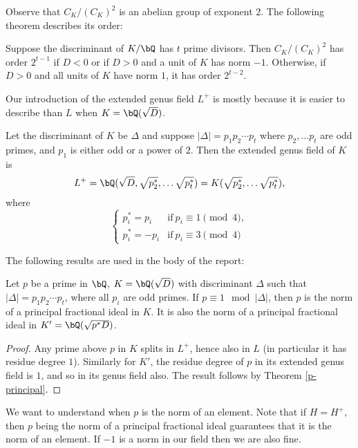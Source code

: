Observe that $C_K / (C_K)^2$ is an abelian group of exponent $2$. The following theorem describes its order:

\begin{thm} 
Suppose the discriminant of $K / \bQ$ has $t$ prime divisors. Then $C_K / (C_K)^2$ has order $2^{t-1}$ if $D < 0$ or if $D > 0$ and a unit of $K$ has norm $-1$. Otherwise, if $D > 0$ and all units of $K$ have norm $1$, it has order $2^{t - 2}$.
\end{thm} 

Our introduction of the extended genus field $L^{+}$ is mostly because it is easier to describe than $L$ when $K = \bQ(\sqrt{D})$.

\begin{thm} 
Let the discriminant of $K$ be $\Delta$ and suppose $|\Delta| = p_1 p_2 \cdots p_t$ where $p_2, \ldots p_t$ are odd primes, and $p_1$ is either odd or a power of $2$. Then the extended genus field of $K$ is 
    \[ L^{+} = \bQ(\sqrt{D}, \sqrt{p_2^*}, \ldots \sqrt{p_t^*}) = K(\sqrt{p_2^*}, \ldots \sqrt{p_t^*}), \] 
where 
\[ \begin{cases}
    p_i^* = p_i & \mathrm{if }\ p_i \equiv 1 \pmod 4, \\
    p_i^* = -p_i & \mathrm{if }\ p_i \equiv 3 \pmod 4
\end{cases}\]
\end{thm} 

\vspace{2em}

The following results are used in the body of the report:

\begin{cor}\label{p-one-mod-disc}
    Let $p$ be a prime in $\bQ$, $K = \bQ(\sqrt{D})$ with discriminant $\Delta$ such that $|\Delta| = p_1 p_2 \cdots p_t$, where all $p_i$ are odd primes. If $p \equiv 1 \mod {|\Delta|}$, then $p$ is the norm of a principal fractional ideal in $K$. It is also the norm of a principal fractional ideal in $K' = \bQ({\sqrt{p^*D}})$.
\end{cor}

\begin{proof}
    Any prime above $p$ in $K$ splits in $L^{+}$, hence also in $L$ (in particular it has residue degree $1$). Similarly for $K'$, the residue degree of $p$ in its extended genus field is $1$, and so in its genus field also. The result follows by Theorem \ref{p-principal}.
\end{proof}

We want to understand when $p$ is the norm of an element. Note that if $H = H^{+}$, then $p$ being the norm of a principal fractional ideal guarantees that it is the norm of an element. If $-1$ is a norm in our field then we are also fine. 


